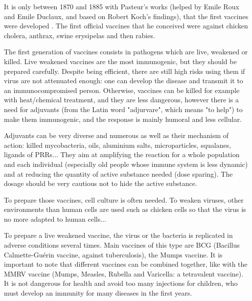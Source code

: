 \documentclass{article}
\begin{document}
            It is only between 1870 and 1885 with Pasteur's works (helped by Emile Roux and Emile Duclaux, and based on Robert Koch's findings), 
                that the first vaccines were developed \autocite{plotkinHistoryVaccination2014}.
            The first official vaccines that he conceived were against chicken cholera, anthrax, swine erysipelas and then rabies.

            The first generation of vaccines consists in pathogens which are live, weakened or killed. Live weakened vaccines are the most immunogenic,
                but they should be prepared carefully. Despite being efficient, there are still high risks using them if virus are not attenuated enough:
                one can develop the disease and transmit it to an immunocompromised person. Otherwise, vaccines can be killed for example with heat/chemical treatment, and they
                are less dangerous, however there is a need for adjuvants (from the Latin word "adjurvare", which means "to help") 
                to make them immunogenic, and the response is mainly humoral and less cellular.

            Adjuvants can be very diverse and numerous as well as their mechanism of action: killed mycobacteria, oils, 
                aluminium salts, microparticles, squalanes, ligands of 
                PRRs... They aim at amplifying the reaction for a whole population and each individual (especially old people whose immune system is less dynamic) and 
                at reducing the quantity of active substance needed (dose sparing). The dosage should be very cautious not to hide the active substance.
                
            To prepare those vaccines, cell culture is often needed. 
            To weaken viruses, other environments than human cells are used such as chicken cells so that the virus is no more adapted to human cells...

            To prepare a live weakened vaccine, the virus or the bacteria is replicated in adverse conditions several times. Main vaccines of this type are BCG
            (Bacillus Calmette-Guérin vaccine, against tuberculosis), the Mumps vaccine. It is important to note that different vaccines can be combined together,
            like with the MMRV vaccine (Mumps, Measles, Rubella and Varicella: a tetravalent vaccine). It is not dangerous for health and avoid too many injections for children,
            who must develop an immunity for many diseases in the first years.            
                       
\end{document}
